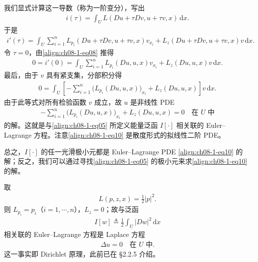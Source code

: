 \documentclass[../../main.tex]{subfiles}
\begin{document}
我们显式计算这一导数（称为一阶变分），写出
\begin{align}
i(\tau)=\int_U L(Du+\tau Dv,u+\tau v,x)\,\mathrm{d}x.\label{align:ch08-1-eq09}
\end{align}
于是
\begin{align*}
i'(\tau)=\int_U\sum_{i=1}^n L_{p_i}(Du+\tau Dv,u+\tau v,x)v_{x_i}+L_z(Du+\tau Dv,u+\tau v,x)v\,\mathrm{d}x.
\end{align*}
令 $\tau=0$，由\eqref{align:ch08-1-eq08} 推得
\begin{align*}
0=i'(0)=\int_U\sum_{i=1}^n L_{p_i}(Du,u,x)v_{x_i}+L_z(Du,u,x)v\,\mathrm{d}x.
\end{align*}
最后，由于 $v$ 具有紧支集，分部积分得
\begin{align*}
0=\int_U\left[-\sum_{i=1}^n\big(L_{p_i}(Du,u,x)\big)_{x_i}+L_z(Du,u,x)\right]v\,\mathrm{d}x.
\end{align*}
由于此等式对所有检验函数 $v$ 成立，故 $u$ 是非线性 PDE
\begin{align}
-\sum_{i=1}^n\big(L_{p_i}(Du,u,x)\big)_{x_i}+L_z(Du,u,x)=0\quad\text{在 }U\text{ 中}\label{align:ch08-1-eq10}
\end{align}
的解。这就是与\eqref{align:ch08-1-eq05} 所定义能量泛函 $I[\cdot]$ 相关联的 Euler--Lagrange 方程。注意\eqref{align:ch08-1-eq10} 是散度形式的拟线性二阶 PDE。

总之，$I[\cdot]$ 的任一光滑极小元都是 Euler--Lagrange PDE \eqref{align:ch08-1-eq10} 的解；反之，我们可以通过寻找\eqref{align:ch08-1-eq05} 的极小元来求\eqref{align:ch08-1-eq10} 的解。

\begin{example}[Dirichlet 原理]\label{example:ch08-1-1-Dirichlet原理}
取
\begin{align*}
L(p,z,x)=\frac{1}{2}|p|^2.
\end{align*}
则 $L_{p_i}=p_i$（$i=1,\cdots,n$），$L_z=0$；故与泛函
\begin{align*}
I[w]\triangleq\frac{1}{2}\int_U|Dw|^2\,\mathrm{d}x
\end{align*}
相关联的 Euler--Lagrange 方程是 Laplace 方程
\begin{align*}
\Delta u=0\quad\text{在 }U\text{ 中}.
\end{align*}
这一事实即 Dirichlet 原理，此前已在 \S2.2.5 介绍。
\end{example}
\end{document}
